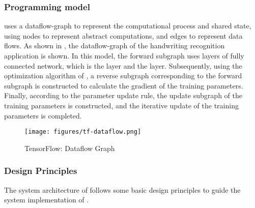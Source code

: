 \begin{content}
\subsubsection{Programming model}
 uses a \gls{dataflow-graph} to represent the computational process and shared state, using \glspl{node} to represent abstract computations, and edges to represent data flows. As shown in , the \gls{dataflow-graph} of the  handwriting recognition application is shown. In this model, the forward subgraph uses  layers of fully connected network, which is the  layer and the  layer. Subsequently, using the optimization algorithm of , a reverse subgraph corresponding to the forward subgraph is constructed to calculate the gradient of the training parameters. Finally, according to the parameter update rule, the update subgraph of the training parameters is constructed, and the iterative update of the training parameters is completed.
\begin{figure}[H]
  \centering
  \texttt{[image: figures/tf-dataflow.png]}
  \caption{TensorFlow: Dataflow Graph}
  \label{fig:tf-dataflow}
\end{figure}


\subsubsection{Design Principles}
The system architecture of \tf{} follows some basic design principles to guide the system implementation of \tf{}.
\begin{enum}
\end{enum}



\end{content}
